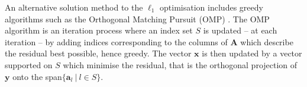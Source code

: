An alternative solution method to the $\ell_1$ optimisation includes greedy algorithms such as the Orthogonal Matching Pursuit (OMP) \cite[P. 65]{FR}. 
The OMP algorithm is an iteration process where an index set $S$ is updated -- at each iteration -- by adding indices corresponding to the columns of $\mathbf{A}$ which describe the residual best possible, hence greedy.
The vector $\mathbf{x}$ is then updated by a vector supported on $S$ which minimise the residual, that is the orthogonal projection of $\mathbf{y}$ onto the span$\lbrace \mathbf{a}_l \ \vert \ l \in S \rbrace$.
